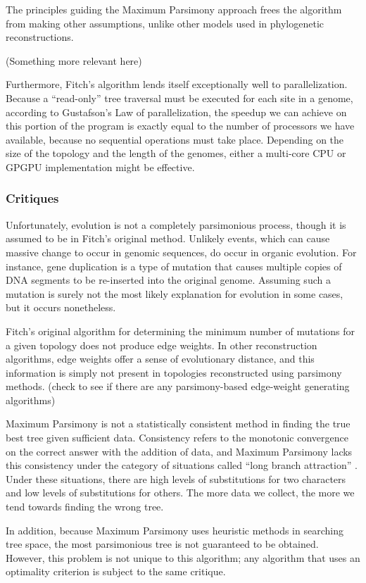 \documentclass[10pt,twocolumn]{article}
\begin{document}
The principles guiding the Maximum Parsimony approach frees the algorithm from making other assumptions, unlike other models used in phylogenetic reconstructions.

(Something more relevant here)

Furthermore, Fitch's algorithm lends itself exceptionally well to parallelization. Because a ``read-only'' tree traversal must be executed for each site in a genome, according to Gustafson's Law of parallelization, the speedup we can achieve on this portion of the program is exactly equal to the number of processors we have available, because no sequential operations must take place. Depending on the size of the topology and the length of the genomes, either a multi-core CPU or GPGPU implementation might be effective.

\subsubsection*{Critiques}
Unfortunately, evolution is not a completely parsimonious process, though it is assumed to be in Fitch's original method. Unlikely events, which can cause massive change to occur in genomic sequences, do occur in organic evolution. For instance, gene duplication is a type of mutation that causes multiple copies of DNA segments to be re-inserted into the original genome. Assuming such a mutation is surely not the most likely explanation for evolution in some cases, but it occurs nonetheless.

Fitch's original algorithm for determining the minimum number of mutations for a given topology does not produce edge weights. In other reconstruction algorithms, edge weights offer a sense of evolutionary distance, and this information is simply not present in topologies reconstructed using parsimony methods. (check to see if there are any parsimony-based edge-weight generating algorithms)

Maximum Parsimony is not a statistically consistent method in finding the true best tree given sufficient data. Consistency refers to the monotonic convergence on the correct answer with the addition of data, and Maximum Parsimony lacks this consistency under the category of situations called ``long branch attraction'' \cite{felsenstein1978cases}. Under these situations, there are high levels of substitutions for two characters and low levels of substitutions for others. The more data we collect, the more we tend towards finding the wrong tree.

In addition, because Maximum Parsimony uses heuristic methods in searching tree space, the most parsimonious tree is not guaranteed to be obtained. However, this problem is not unique to this algorithm; any algorithm that uses an optimality criterion is subject to the same critique.
\end{document}
